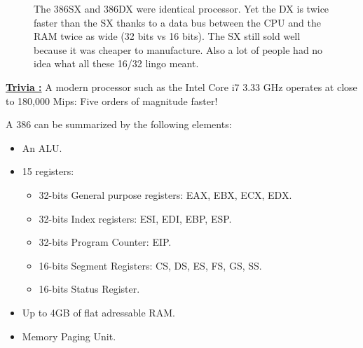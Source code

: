 \documentclass[book.tex]{subfiles}
\begin{document}
\begin{figure}[H]
\centering
   \caption{The 386SX and 386DX were identical processor. Yet the DX is twice faster than the SX thanks to a data bus between the CPU and the RAM twice as wide (32 bits vs 16 bits). The SX still sold well because it was cheaper to manufacture. Also a lot of people had no idea what all these 16/32 lingo meant.} \label{fig:mips}
 \end{figure}
 \par
 \textbf{\underline{Trivia :}} A modern processor such as the Intel Core i7 3.33 GHz operates at close to 180,000 Mips: Five orders of magnitude faster!\\
\par

A 386 can be summarized by the following elements:
\begin{itemize}
\item An ALU.
\item 15 registers:
\begin{itemize}
  \item 32-bits General purpose registers: EAX, EBX, ECX, EDX.
  \item 32-bits Index registers: ESI, EDI, EBP, ESP.
  \item 32-bits Program Counter: EIP.
  \item 16-bits Segment Registers: CS, DS, ES, FS, GS, SS.
  \item 16-bits Status Register.
\end{itemize}
\item Up to 4GB of flat adressable RAM.
\item Memory Paging Unit.
\end{itemize}
\end{document}
